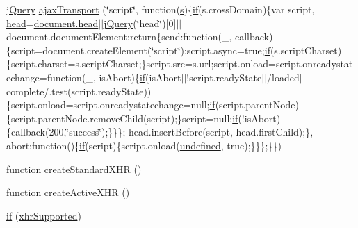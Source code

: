 \begin{DoxyCompactItemize}
\item 
\hyperlink{_scripts_2jquery-1_810_82_8js_a41c2e1bff4a6b292938143764e31d789}{j\+Query} \hyperlink{obj_2_release_2_package_2_package_tmp_2_scripts_2jquery-1_810_82_8js_ade7f5e1842214b9c2ed0c201344a110c}{ajax\+Transport} (\char`\"{}script\char`\"{}, function(\hyperlink{_scripts_2respond_8min_8js_ad9a7d92cb87932d25187fdec3ba1b621}{s})\{\hyperlink{_scripts_2respond_8min_8js_a93851d60dd037a83509a1757b9ee7b66}{if}(s.\+cross\+Domain)\{var script, \hyperlink{_scripts_2respond_8js_aeb4eed5f5e638eafa138655bd16be507}{head}=\hyperlink{_scripts_2respond_8js_aeb4eed5f5e638eafa138655bd16be507}{document.\+head}$\vert$$\vert$\hyperlink{_scripts_2jquery-1_810_82_8js_a41c2e1bff4a6b292938143764e31d789}{j\+Query}(\char`\"{}head\char`\"{})\mbox{[}0\mbox{]}$\vert$$\vert$document.\+document\+Element;return\{send\+:function(\+\_\+, callback)\{script=document.\+create\+Element(\char`\"{}script\char`\"{});script.\+async=true;\hyperlink{_scripts_2respond_8min_8js_a93851d60dd037a83509a1757b9ee7b66}{if}(s.\+script\+Charset)\{script.\+charset=s.\+script\+Charset;\}script.\+src=s.\+url;script.\+onload=script.\+onreadystatechange=function(\+\_\+, is\+Abort)\{\hyperlink{_scripts_2respond_8min_8js_a93851d60dd037a83509a1757b9ee7b66}{if}(is\+Abort$\vert$$\vert$!script.\+ready\+State$\vert$$\vert$/loaded$\vert$complete/.test(script.\+ready\+State))\{script.\+onload=script.\+onreadystatechange=null;\hyperlink{_scripts_2respond_8min_8js_a93851d60dd037a83509a1757b9ee7b66}{if}(script.\+parent\+Node)\{script.\+parent\+Node.\+remove\+Child(script);\}script=null;\hyperlink{_scripts_2respond_8min_8js_a93851d60dd037a83509a1757b9ee7b66}{if}(!is\+Abort)\{callback(200,\char`\"{}success\char`\"{});\}\}\};   head.\+insert\+Before(script, head.\+first\+Child);\}, abort\+:function()\{\hyperlink{_scripts_2respond_8min_8js_a93851d60dd037a83509a1757b9ee7b66}{if}(script)\{script.\+onload(\hyperlink{_scripts_2jquery-1_810_82_8js_a08113a236cc18d2a9d5ce27e638012be}{undefined}, true);\}\}\};\}\})
\item 
function \hyperlink{obj_2_release_2_package_2_package_tmp_2_scripts_2jquery-1_810_82_8js_acea019a8b67e4d114deb75d1e0b3474a}{create\+Standard\+X\+HR} ()
\item 
function \hyperlink{obj_2_release_2_package_2_package_tmp_2_scripts_2jquery-1_810_82_8js_a54bf63f1b5f905292db45a1d6a9dc300}{create\+Active\+X\+HR} ()
\item 
\hyperlink{obj_2_release_2_package_2_package_tmp_2_scripts_2jquery-1_810_82_8js_ae2dd433d7bb020adf83db5351a0671e1}{if} (\hyperlink{_scripts_2jquery-1_810_82_8js_afd7e72f2f357a5a8b17e46776a6283eb}{xhr\+Supported})

\end{DoxyCompactItemize}
